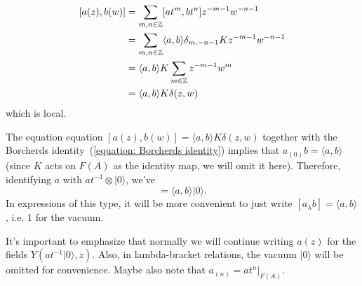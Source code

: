  \begin{equation}
 \begin{split}
      [a(z),b(w)]&=\sum_{m,n\in\mathbb{Z}}[at^m,bt^n]z^{-m-1}w^{-n-1}\\
      &=\sum_{m,n\in\mathbb{Z}}\langle a,b\rangle\delta_{m,-n-1}Kz^{-m-1}w^{-n-1}\\
      &=\langle a,b\rangle K\sum_{m\in\mathbb{Z}}z^{-m-1}w^m\\
      &=\langle a,b\rangle K\delta(z,w)
 \end{split}
 \end{equation}
 which is local.\par
 The equation equation $[a(z),b(w)]=\langle a,b\rangle K\delta(z,w)$ together with the Borcherds identity~(\ref{equation: Borcherds identity}) implies that $a_{(0)}b=\langle a,b\rangle$ (since $K$ acts on $F(A)$ as the identity map, we will omit it here). Therefore, identifying $a$ with $at^{-1}\otimes |0\rangle$, we've
 \begin{equation}
     [a_\lambda b]=\langle a,b\rangle|0\rangle.
 \end{equation}
 In expressions of this type, it will be more convenient to just write $ [a_\lambda b]=\langle a,b\rangle$, i.e. 1 for the vacuum. 
 \begin{dang}
     \begin{notation}
         It's important to emphasize that normally we will continue writing $a(z)$ for the fields $Y(at^{-1}|0\rangle,z)$. Also, in lambda-bracket relations, the vacuum $|0\rangle$ will be omitted for convenience. Maybe also note that $a_{(n)}=at^n\big|_{F(A)}$.
     \end{notation}
 \end{dang}

